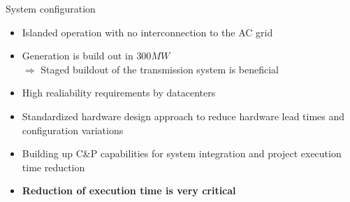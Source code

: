 \begin{frame}{System configuration}
  \begin{itemize}
    \setlength{\itemsep}{0.5em}
    \item Islanded operation with no interconnection to the AC grid
    \item Generation is build out in $300MW$\\ $\Rightarrow$ Staged buildout of the transmission system is beneficial
    \item High realiability requirements by datacenters
    \item Standardized hardware design approach to reduce hardware lead times and configuration variations
    \item Building up C\&P capabilities for system integration and project execution time reduction
    \item \textbf{Reduction of execution time is very critical}
  \end{itemize}
\end{frame}




